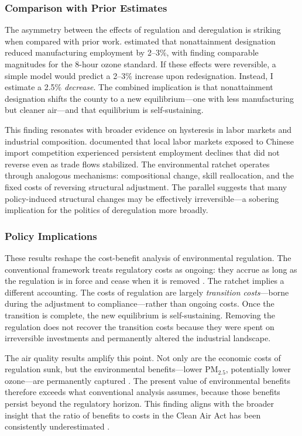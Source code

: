 \documentclass[12pt]{article}
\begin{document}
\subsubsection*{Comparison with Prior Estimates} The asymmetry between the effects of regulation and deregulation is striking when compared with prior work. \citet{Greenstone2002} estimated that nonattainment designation reduced manufacturing employment by 2--3\%, with \citet{Curtis2018} finding comparable magnitudes for the 8-hour ozone standard. If these effects were reversible, a simple model would predict a 2--3\% increase upon redesignation. Instead, I estimate a 2.5\% \textit{decrease}. The combined implication is that nonattainment designation shifts the county to a new equilibrium---one with less manufacturing but cleaner air---and that equilibrium is self-sustaining.

This finding resonates with broader evidence on hysteresis in labor markets and industrial composition. \citet{AutorDornHanson2013} documented that local labor markets exposed to Chinese import competition experienced persistent employment declines that did not reverse even as trade flows stabilized. The environmental ratchet operates through analogous mechanisms: compositional change, skill reallocation, and the fixed costs of reversing structural adjustment. The parallel suggests that many policy-induced structural changes may be effectively irreversible---a sobering implication for the politics of deregulation more broadly.

\subsubsection*{Policy Implications} These results reshape the cost-benefit analysis of environmental regulation. The conventional framework treats regulatory costs as ongoing: they accrue as long as the regulation is in force and cease when it is removed \citep{Jaffe1995}. The ratchet implies a different accounting. The costs of regulation are largely \textit{transition costs}---borne during the adjustment to compliance---rather than ongoing costs. Once the transition is complete, the new equilibrium is self-sustaining. Removing the regulation does not recover the transition costs because they were spent on irreversible investments and permanently altered the industrial landscape.

The air quality results amplify this point. Not only are the economic costs of regulation sunk, but the environmental benefits---lower PM$_{2.5}$, potentially lower ozone---are permanently captured \citep{Shapiro2018}. The present value of environmental benefits therefore exceeds what conventional analysis assumes, because those benefits persist beyond the regulatory horizon. This finding aligns with the broader insight that the ratio of benefits to costs in the Clean Air Act has been consistently underestimated \citep{ZivinNeidell2012}.
\end{document}

